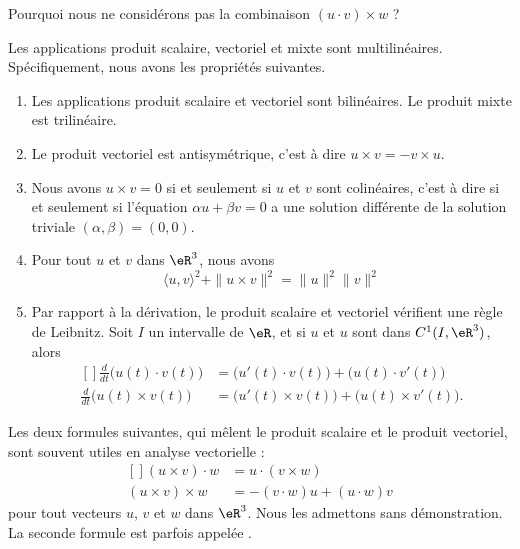Pourquoi nous ne considérons pas la combinaison $(u\cdot v)\times w$ ?

\begin{proposition}		 \label{PropScalMixtLin}
	Les applications produit scalaire, vectoriel et mixte sont multilinéaires. Spécifiquement, nous avons les propriétés suivantes.
	\begin{enumerate}
		\item
			Les applications produit scalaire et vectoriel sont bilinéaires. Le produit mixte est trilinéaire.
		\item
			Le produit vectoriel est antisymétrique, c'est à dire $u\times v=-v\times u$.
		\item
			Nous avons $u\times v=0$ si et seulement si $u$ et $v$ sont colinéaires, c'est à dire si et seulement si l'équation $\alpha u+\beta v=0$ a une solution différente de la solution triviale $(\alpha,\beta)=(0,0)$.
		\item		\label{ItemPropScalMixtLiniv}
			Pour tout $u$ et $v$ dans $\eR^3$, nous avons
			\begin{equation}
				\langle u, v\rangle^2 +\| u\times v \|^2=\| u \|^2\| v \|^2
			\end{equation}
		\item
			Par rapport à la dérivation, le produit scalaire et vectoriel vérifient une règle de Leibnitz. Soit $I$ un intervalle de $\eR$, et si $u$ et $u$ sont dans $C^1(I,\eR^3)$, alors
			\begin{equation}		\label{EqFormLeibProdscalVect}
				\begin{aligned}[]
					\frac{ d }{ dt }\big( u(t)\cdot v(t) \big)&=\big( u'(t)\cdot v(t) \big)+\big( u(t)\cdot v'(t) \big)\\
					\frac{ d }{ dt }\big( u(t)\times v(t) \big)&=\big( u'(t)\times v(t) \big)+\big( u(t)\times v'(t) \big).
				\end{aligned}
			\end{equation}
		\end{enumerate}
\end{proposition}

Les deux formules suivantes, qui mêlent le produit scalaire et le produit vectoriel, sont souvent utiles en analyse vectorielle :
\begin{equation}
	\begin{aligned}[]
		(u\times v)\cdot w&=u\cdot(v\times w)\\
		(u\times v)\times w&=-(v\cdot w)u+(u\cdot w)v		\label{EqFormExpluxxx}
	\end{aligned}
\end{equation}
pour tout vecteurs $u$, $v$ et $w$ dans $\eR^3$. Nous les admettons sans démonstration. La seconde formule est parfois appelée .

